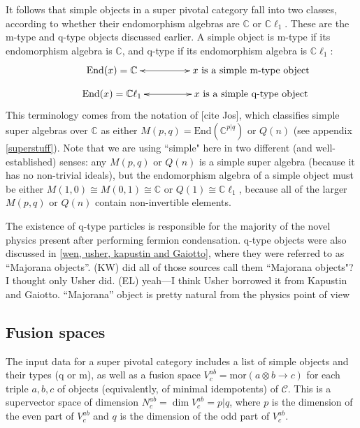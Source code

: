 \documentclass[12pt,a4paper]{article}
\newcommand{\tp}{\otimes}
\newcommand{\cc}{\mathbb{C}}
\newcommand{\mcc}{\mathcal{C}}
\newcommand{\zt}{\mathbb{Z}_2}
\newcommand{\mor}{\text{mor}}
\newcommand{\End}{\text{End}}
\newcommand{\cl}{\mathbb{C}\ell}
\newcommand{\ethan}[1]{{\color{amethyst}\footnotesize{(EL) #1}}}
\newcommand{\kw}[1]{{\color{kwcolor}\footnotesize{(KW) #1}}}
\begin{document}
It follows that simple objects in a super pivotal category fall into two classes, according to whether their endomorphism algebras are $\cc$ or $\cl_1$. 
These are the m-type and q-type objects discussed earlier. 
A simple object is {m-type} if its endomorphism algebra
is $\cc$, and {q-type} if its endomorphism algebra is $\cl_1$:
\begin{align}
\vcenter{\xymatrix @!0 @M=1mm @C=25mm{
& \text{End}(x) = \mathbb{C} \ar@{<->}[rr] &   &\text{$x$ is a simple m-type object}&  \\
&\text{End}(x) = \mathbb{C} \ell_1 \ar@{<->}[rr]  &  &\text{$x$ is a simple q-type object}&
	}}
\end{align}
This terminology comes from the notation of [cite Jos], which classifies simple super algebras over $\cc$ as either
$M(p,q) = \End(\cc^{p|q})$ or $Q(n)$ (see appendix \ref{superstuff}).
Note that we are using ``simple" here in two different (and well-established) senses: 
any $M(p,q)$ or $Q(n)$ is a simple super algebra
(because it has no non-trivial ideals), but the endomorphism algebra of a simple object must be either
$M(1,0) \cong M(0,1) \cong \cc$ or $Q(1) \cong \cl_1$,
because all of the larger $M(p,q)$ or $Q(n)$ contain non-invertible elements.

The existence of q-type particles is responsible for the majority of the novel physics present after performing fermion condensation. 
q-type objects were also discussed in \ref{wen, usher, kapustin and Gaiotto}, where they were referred to as ``Majorana objects''. 
\kw{did all of those sources call them ``Majorana objects"?  I thought only Usher did.}
\ethan{yeah---I think Usher borrowed it from Kapustin and Gaiotto. ``Majorana'' object is pretty natural from the physics point of view}



\subsection{Fusion spaces} \label{fusion_spaces}

The input data for a super pivotal category includes a list of simple objects and their types (q or m), 
as well as a fusion space $V^{ab}_c = \mor(a\tp b \to c)$ for each triple $a,b,c$ of objects (equivalently, of minimal idempotents)
of $\mcc$.
This is a supervector space of dimension
$N^{ab}_c = \dim V^{ab}_c = p|q$, where $p$ is the dimension of the even part
of $V^{ab}_c$ and $q$ is the dimension of the odd part of $V^{ab}_c$.
\end{document}
